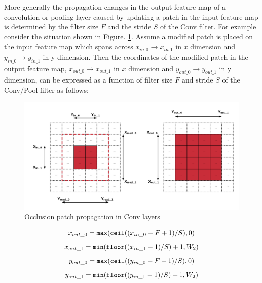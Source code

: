 \documentclass[10, sigconf]{acmart}
\begin{document}
More generally the propagation changes in the output feature map of a convolution or pooling layer caused by updating a patch in the input feature map is determined by the filter size $F$ and the stride $S$ of the Conv filter.
For example consider the situation shown in Figure. \ref{fig:patch_propagation}.
Assume a modified patch is placed on the input feature map which spans across $x_{in\_0}\rightarrow x_{in\_1}$ in $x$ dimension and $y_{in\_0}\rightarrow y_{in\_1}$ in y dimension.
Then the coordinates of the modified patch in the output feature map,  $x_{out\_0}\rightarrow x_{out\_1}$ in $x$ dimension and $y_{out\_0}\rightarrow y_{out\_1}$ in y dimension, can be expressed as a function of filter size $F$ and stride $S$ of the Conv/Pool filter as follows:

\begin{figure}
  \includegraphics[width=\columnwidth]{./images/patch_propagation}
  \caption{Occlusion patch propagation in Conv layers}
  \label{fig:patch_propagation}
\end{figure}

\begin{equation}
x_{out\_0} = \texttt{max}(\texttt{ceil}((x_{in\_0} - F + 1)/S), 0) \\
\end{equation}
\begin{equation}
x_{out\_1} = \texttt{min}(\texttt{floor}((x_{in\_1} - 1)/S) + 1, W_2) \\
\end{equation}
\begin{equation}
y_{out\_0} = \texttt{max}(\texttt{ceil}((y_{in\_0} - F + 1)/S), 0) \\
\end{equation}
\begin{equation}
y_{out\_1} = \texttt{min}(\texttt{floor}((y_{in\_1} - 1)/S) + 1, W_2)\\
\end{equation}
\end{document}
